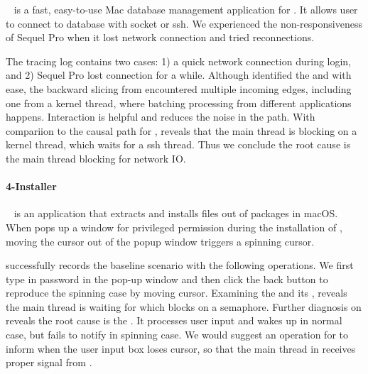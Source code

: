 ~\cite{SequelPro} is a fast, easy-to-use Mac database management
application for . It allows user to connect to database with socket or ssh.
We experienced the non-responsiveness of Sequel Pro when it lost network
connection and tried reconnections.

The tracing log contains two cases: 1) a quick network connection during login,
and 2) Sequel Pro lost connection for a while. Although \xxx identified the
\spinningnode and \similarnode with ease, the backward slicing from \similarnode
encountered multiple incoming edges, including one from a kernel thread, where
batching processing from different applications happens. Interaction is helpful
and reduces the noise in the path. With compariion to the causal path for
\similarnode, \xxx reveals that the main thread is blocking on a kernel thread,
which waits for a ssh thread. Thus we conclude the root cause is the main thread
blocking for network IO.

\paragraph{4-Installer}

~\cite{Installer} is an application that extracts and installs
files out of  packages in macOS. When  pops up a window
for privileged permission during the installation of ,
moving the cursor out of the popup window triggers a spinning cursor.

\xxx successfully records the baseline scenario with the following operations.
We first type in password in the pop-up window and then click the back button to
reproduce the spinning case by moving cursor. Examining the \spinningnode and
its \similarnode, \xxx reveals the main thread is waiting for  which
blocks on a semaphore. Further diagnosis on  reveals the root cause
is the . It processes user input and wakes up  in
normal case, but fails to notify  in spinning case. We would suggest
an operation for  to inform  when the user input box
loses cursor, so that the main thread in  receives proper signal
from .

